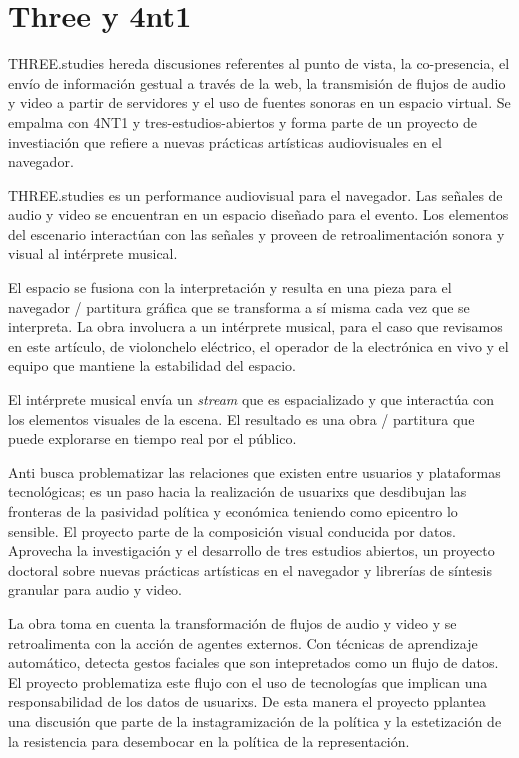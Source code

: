 
\section*{Three y 4nt1} %

THREE.studies hereda discusiones referentes al punto de vista, la co-presencia, el envío de información gestual a través de la web, la transmisión de flujos de audio y video a partir de servidores y el uso de fuentes sonoras en un espacio virtual. Se empalma con 4NT1 y tres-estudios-abiertos y forma parte de un proyecto de investiación que refiere a nuevas prácticas artísticas audiovisuales en el navegador.  

THREE.studies es un performance audiovisual para el navegador. Las señales de audio y video se encuentran en un espacio diseñado para el evento. Los elementos del escenario interactúan con las señales y proveen de retroalimentación sonora y visual al intérprete musical.

El espacio se fusiona con la interpretación y resulta en una pieza para el navegador / partitura gráfica que se transforma a sí misma cada vez que se interpreta. La obra involucra a un intérprete musical, para el caso que revisamos en este artículo, de violonchelo eléctrico, el operador de la electrónica en vivo y el equipo que mantiene la estabilidad del espacio.

El intérprete musical envía un \textit{stream} que es espacializado y que interactúa con los elementos visuales de la escena. El resultado es una obra / partitura que puede explorarse en tiempo real por el público. 

Anti busca problematizar las relaciones que existen entre usuarios y plataformas tecnológicas; es un paso hacia la realización de usuarixs que desdibujan las fronteras de la pasividad política y económica teniendo como epicentro lo sensible. El proyecto parte de la composición visual conducida por datos. Aprovecha la investigación y el desarrollo de tres estudios abiertos, un proyecto doctoral sobre nuevas prácticas artísticas en el navegador y librerías de síntesis granular para audio y video.

La obra toma en cuenta la transformación de flujos de audio y video y se retroalimenta con la acción de agentes externos. Con técnicas de aprendizaje automático, detecta gestos faciales que son intepretados como un flujo de datos. El proyecto problematiza este flujo con el uso de tecnologías que implican una responsabilidad de los datos de usuarixs. De esta manera el proyecto pplantea una discusión que parte de la instagramización de la política y la estetización de la resistencia para desembocar en la política de la representación.


